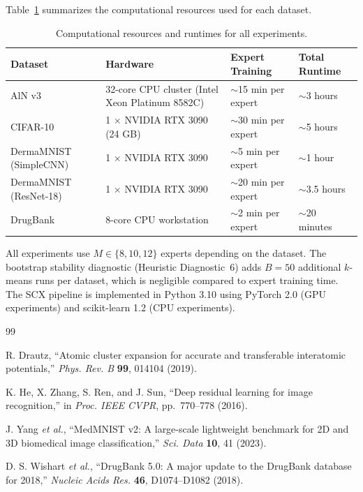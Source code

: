 Table~\ref{tab:compute} summarizes the computational resources used for each dataset.

\begin{table}[htbp]
\centering
\caption{Computational resources and runtimes for all experiments.}
\label{tab:compute}
\begin{tabular}{llll}
\toprule
Dataset & Hardware & Expert Training & Total Runtime \\
\midrule
AlN v3 & 32-core CPU cluster (Intel Xeon Platinum 8582C) & $\sim$15 min per expert & $\sim$3 hours \\
CIFAR-10 & 1 $\times$ NVIDIA RTX 3090 (24 GB) & $\sim$30 min per expert & $\sim$5 hours \\
DermaMNIST (SimpleCNN) & 1 $\times$ NVIDIA RTX 3090 & $\sim$5 min per expert & $\sim$1 hour \\
DermaMNIST (ResNet-18) & 1 $\times$ NVIDIA RTX 3090 & $\sim$20 min per expert & $\sim$3.5 hours \\
DrugBank & 8-core CPU workstation & $\sim$2 min per expert & $\sim$20 minutes \\
\bottomrule
\end{tabular}
\end{table}

All experiments use $M \in \{8, 10, 12\}$ experts depending on the dataset. The bootstrap stability diagnostic (Heuristic Diagnostic~6) adds $B = 50$ additional $k$-means runs per dataset, which is negligible compared to expert training time. The SCX pipeline is implemented in Python 3.10 using PyTorch 2.0 (GPU experiments) and scikit-learn 1.2 (CPU experiments).

\begin{thebibliography}{99}

R. Drautz, ``Atomic cluster expansion for accurate and transferable interatomic potentials,'' \emph{Phys. Rev. B} \textbf{99}, 014104 (2019).

K. He, X. Zhang, S. Ren, and J. Sun, ``Deep residual learning for image recognition,'' in \emph{Proc. IEEE CVPR}, pp.~770--778 (2016).

J. Yang \emph{et al.}, ``MedMNIST v2: A large-scale lightweight benchmark for 2D and 3D biomedical image classification,'' \emph{Sci. Data} \textbf{10}, 41 (2023).

D. S. Wishart \emph{et al.}, ``DrugBank 5.0: A major update to the DrugBank database for 2018,'' \emph{Nucleic Acids Res.} \textbf{46}, D1074--D1082 (2018).

\end{thebibliography}
